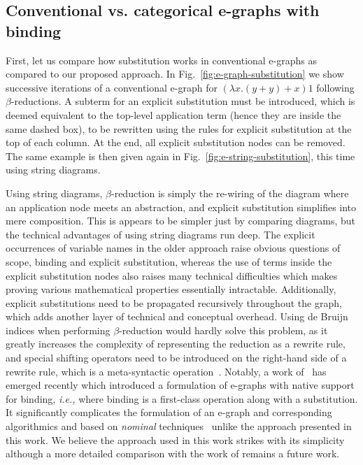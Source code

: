 \subsection{Conventional vs. categorical e-graphs with binding}

First, let us compare how substitution works in conventional e-graphs as compared to our proposed approach.
In Fig.~\ref{fig:e-graph-substitution} we show successive iterations of a conventional e-graph for $(\lambda x . (y + y) + x) 1$ following $\beta$-reductions.
A subterm for an explicit substitution must be introduced, which is deemed equivalent to the top-level application term (hence they are inside the same dashed box), to be rewritten using the rules for explicit substitution at the top of each column.
At the end, all explicit substitution nodes can be removed.
The same example is then given again in Fig.~\ref{fig:e-string-substitution}, this time using string diagrams. 

Using string diagrams, $\beta$-reduction is simply the re-wiring of the diagram where an application node meets an abstraction, and explicit substitution simplifies into mere composition. 
This is appears to be simpler just by comparing diagrams, but the technical advantages of using string diagrams run deep. 
The explicit occurrences of variable names in the older approach raise obvious questions of scope, binding and explicit substitution, whereas the use of terms inside the explicit substitution nodes also raises many technical difficulties which makes proving various mathematical properties essentially intractable. 
Additionally, explicit substitutions need to be propagated recursively throughout the graph, which adds another layer of technical and conceptual overhead. 
Using de Bruijn indices when performing $\beta$-reduction would hardly solve this problem, as it greatly increases the complexity of representing the reduction as a rewrite rule, and special shifting operators need to be introduced on the right-hand side of a rewrite rule, which is a meta-syntactic operation~\cite{koehler2022sketchguided}.
Notably, a work of~\cite{slotted-egraphs} has emerged recently which introduced a formulation of e-graphs with native support for binding, \textit{i.e.,} where binding is a first-class operation along with a substitution.
It significantly complicates the formulation of an e-graph and corresponding algorithmics and based on \textit{nominal} techniques~\cite{Pitts_2013} unlike the approach presented in this work.
We believe the approach used in this work strikes with its simplicity although a more detailed comparison with the work of remains a future work.

